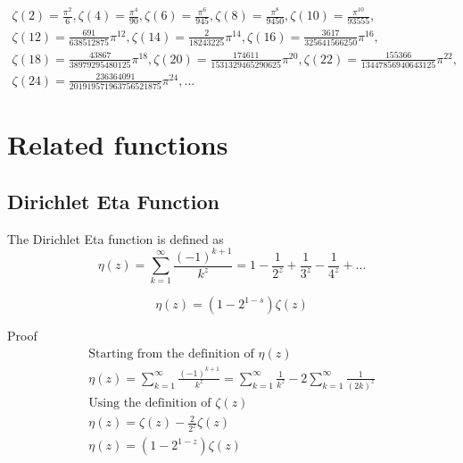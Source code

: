 \documentclass[a4paper]{article}
\begin{document}
\begin{gather*}
\zeta(2) = \frac{\pi^2}{6}, 
\zeta(4) = \frac{\pi^4}{90},
\zeta(6) = \frac{\pi^6}{945},
\zeta(8) = \frac{\pi^8}{9450},
\zeta(10) = \frac{\pi^{10}}{93555},
\\
\zeta(12) = \frac{691}{638512875} \pi^{12},
\zeta(14) = \frac{2}{18243225} \pi^{14},
\zeta(16) = \frac{3617}{325641566250} \pi^{16},
\\
\zeta(18) = \frac{43867}{38979295480125} \pi^{18},
\zeta(20) = \frac{174611}{1531329465290625} \pi^{20},
\zeta(22) = \frac{155366}{13447856940643125} \pi^{22},
\\
\zeta(24) = \frac{236364091}{201919571963756521875} \pi^{24},
\dots
\end{gather*}

\pagebreak

\section{Related functions}

\subsection{Dirichlet Eta Function}

\begin{definition}\label{Dirichlet Eta Function def}
The Dirichlet Eta function is defined as 
$$
\eta(z) = \sum_{k=1}^{\infty} \frac{(-1)^{k+1}}{k^z} = 1 - \frac{1}{2^z} +  \frac{1}{3^z} -  \frac{1}{4^z} + ...
$$
\end{definition}

\begin{theorem}
\begin{equation}
\boxed{
\eta(z) = (1 - 2^{1-s}) \zeta(z)
}
\end{equation}

Proof
\\
\begin{gather*}
\text{Starting from the definition of $\eta(z)$}
\\
\eta(z) 
=
\sum_{k=1}^{\infty} \frac{(-1)^{k+1}}{k^z}
=
\sum_{k=1}^{\infty} \frac{1}{k^z} - 2 \sum_{k=1}^{\infty} \frac{1}{(2k)^z}
\\
\text{Using the definition of $\zeta(z)$}
\\
\eta(z) 
=
\zeta(z) - \frac{2}{2^{z}} \zeta(z)
\\
\eta(z) = (1 - 2^{1-z}) \zeta(z)
\end{gather*}
\end{theorem}
\end{document}
